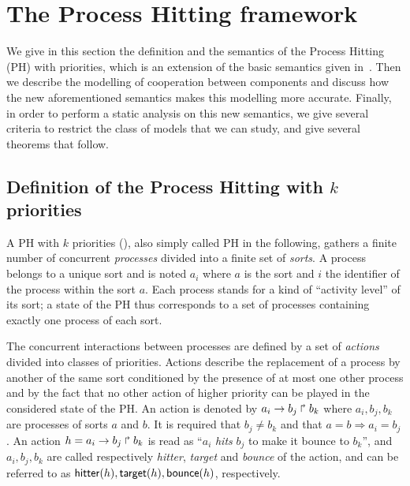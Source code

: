 \section{The Process Hitting framework}

We give in this section the definition and the semantics of the Process Hitting (PH) with priorities, which is an extension of the basic semantics given in~\cite{PMR10-TCSB}.
Then we describe the modelling of cooperation between components and discuss how the new aforementioned semantics makes this modelling more accurate.
Finally, in order to perform a static analysis on this new semantics, we give several criteria to restrict the class of models that we can study,
and give several theorems that follow.

\subsection{Definition of the Process Hitting with $k$ priorities}
\label{ssec:PH}
A PH with $k$ priorities (), also simply called PH  in the following, gathers a finite number of concurrent \emph{processes} divided into a finite set of \emph{sorts}.
A process belongs to a unique sort and is noted $a_i$ where $a$ is the sort and $i$ the identifier of the process within the sort $a$.
Each process stands for a kind of “activity level” of its sort; a state of the PH thus corresponds to a set of processes containing exactly one process of each sort.

The concurrent interactions between processes are defined by a set of \emph{actions} divided into classes of priorities.
Actions describe the replacement of a process by another of the same sort conditioned by the presence of at most one other process and by the fact that no other action of higher priority can be played in the considered state of the PH.
An action is denoted by $a_i\rightarrow b_j\Rsh b_k$ where $a_i,b_j,b_k$ are processes of sorts $a$ and $b$.
It is required that $b_j \neq b_k$ and that $a=b\Rightarrow a_i=b_j$.
An action $h=a_i\rightarrow b_j\Rsh b_k$ is read as ``$a_i$ \emph{hits} $b_j$ to make it bounce to $b_k$'', and $a_i,b_j,b_k$ are called respectively \emph{hitter}, \emph{target} and \emph{bounce} of the action, and can be referred to as $\mathsf{hitter}(h), \mathsf{target}(h), \mathsf{bounce}(h)$, respectively.

